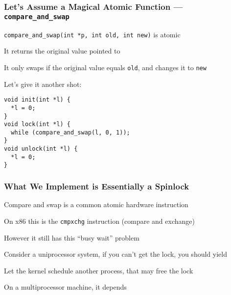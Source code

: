   \begin{frame}[fragile]
    \frametitle{Let's Assume a Magical Atomic Function ---
                \texttt{compare\_and\_swap}}

    \texttt{compare\_and\_swap(int *p, int old, int new)} is atomic

    \hspace{2em} It returns the original value pointed to

    \hspace{2em} It only swaps if the original value equals \texttt{old}, and changes it to \texttt{new}

    \vspace{2em}

    Let's give it another shot:

    \begin{lstlisting}
void init(int *l) {
  *l = 0;
}
void lock(int *l) {
  while (compare_and_swap(l, 0, 1));
}
void unlock(int *l) {
  *l = 0;
}   
    \end{lstlisting}
  \end{frame}

  \begin{frame}
    \frametitle{What We Implement is Essentially a Spinlock}

    Compare and swap is a common atomic hardware instruction

    \vspace{2em}

    On x86 this is the \texttt{cmpxchg} instruction (compare and exchange)

    \vspace{2em}

    However it still has this ``busy wait'' problem

    \vspace{2em}

    Consider a uniprocessor system, if you can't get the lock, you should yield

    \hspace{2em} Let the kernel schedule another process, that may free the lock

    \vspace{2em}

    On a multiprocessor machine, it depends
  \end{frame}

